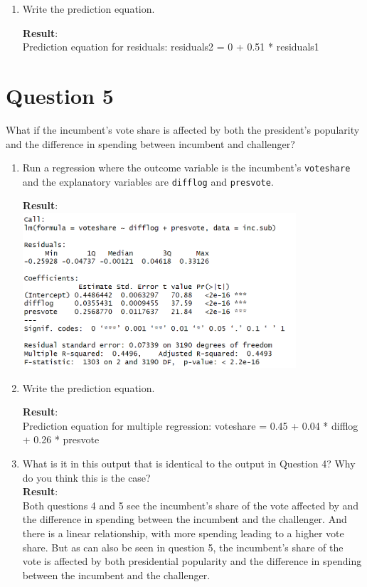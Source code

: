 \documentclass[12pt,letterpaper]{article}
\begin{document}
\begin{enumerate}
			\vspace{.25cm}
		\item Write the prediction equation.
			\vspace{.25cm}
			 
			\textbf{Result}:\\
			Prediction equation for residuals: residuals2 = 0 + 0.51 * residuals1
	\end{enumerate}
	
	\newpage	

\section*{Question 5}
\noindent What if the incumbent's vote share is affected by both the president's popularity and the difference in spending between incumbent and challenger? 
	\begin{enumerate}
		\item Run a regression where the outcome variable is the incumbent's \texttt{voteshare} and the explanatory variables are \texttt{difflog} and \texttt{presvote}.	
			\vspace{.25cm}
			 
			\textbf{Result}:\\
			\includegraphics[width=0.8\textwidth]{plot_5a.png}
			\vspace{.25cm}
		\item Write the prediction equation.	
			\vspace{.25cm}
			 
			\textbf{Result}:\\
			Prediction equation for multiple regression: voteshare = 0.45 + 0.04 * difflog + 0.26 * presvote
		\item What is it in this output that is identical to the output in Question 4? Why do you think this is the case?\\
			\textbf{Result}:\\
			Both questions 4 and 5 see the incumbent's share of the vote affected by and the difference in spending between the incumbent and the challenger. And there is a linear relationship, with more spending leading to a higher vote share. But as can also be seen in question 5, the incumbent's share of the vote is affected by both presidential popularity and the difference in spending between the incumbent and the challenger.
	\end{enumerate}
\end{document}
